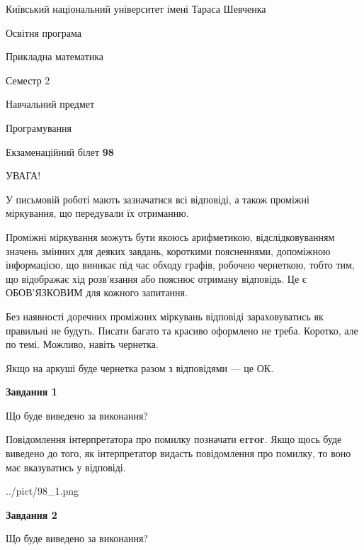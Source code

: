 \documentclass[12pt, ukrainian]{article}
\begin{document}
{{\begin {small}\par
{ \center  Київський національний університет імені Тараса Шевченка \par}
{\parbox {5 cm}{Освітня програма \hfill}{\parbox {7 cm}{Прикладна математика \hfill}}\parbox {6 cm}{\hfill Семестр 2}}\par
{\parbox {5 cm} {Навчальний предмет \hfill}\parbox {7 cm}{Програмування \hfill}\parbox {6cm}{\hfill}\par}\vspace{-7pt} \end{small}}{\center Екзаменаційний білет \No \textbf
{ 98 }\par}}
{
\begin {large}
УВАГА!

У письмовій роботі мають зазначатися всі відповіді, а також проміжні міркування, що передували їх отриманню.

Проміжні міркування можуть бути якоюсь арифметикою, відслідковуванням зна\-чень змінних для деяких завдань,
короткими поясненнями, допоміжною інформацією, що виникає під час обходу графів, робочею чернеткою,
тобто тим, що відображає хід розв’язання або пояснює отриману відповідь.
Це є ОБОВ’ЯЗКОВИМ для кожного запитання.

Без наявності доречних проміжних міркувань відповіді зараховуватись як правиль\-ні не будуть.
Писати багато та красиво оформлено не треба. Коротко, але по темі. Можли\-во, навіть чернетка.

Якщо на аркуші буде чернетка разом з відповідями --- це ОК.

\newpage

{\begin {center}\textbf{Завдання 1}\end {center}}\par
Що буде виведено за виконання?

Повідомлення інтерпретатора про помилку позначати \textbf{error}.
Якщо щось буде виведено до того, як інтерпретатор видасть повідомлення про помилку, 
то воно має вказуватись у відповіді. \par


\begin{center}
	{../pict/98_1.png}
\end{center}
\newpage

{\begin {center}\textbf{Завдання 2}\end {center}}\par
Що буде виведено за виконання?


\end{large}}
\end{document}
